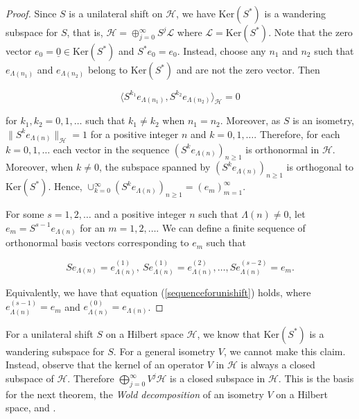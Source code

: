 \documentclass[10pt, reqno]{amsart}
\theoremstyle{definition}
\numberwithin{equation}{section}
\begin{document}
\begin{proof}
    Since $S$ is a unilateral shift on $\mathcal{H}$, we have $\mathrm{Ker}(S^{*})$ is a wandering subspace for $S$, that is, $\mathcal{H}=\oplus_{j=0}^{\infty} S^{j}\mathcal{L}$ where $\mathcal{L}=\mathrm{Ker}(S^{*})$. Note that the zero vector $e_{0}=\underline{0}\in\mathrm{Ker}(S^{*})$ and $S^{*}e_{0}=e_{0}$. Instead, choose any $n_{1}$ and $n_{2}$ such that $e_{\Lambda(n_{1})}$ and $e_{\Lambda(n_{2})}$ belong to $\mathrm{Ker}(S^{*})$ and are not the zero vector. Then

$$\Big\langle S^{k_{1}}e_{\Lambda(n_{1})},S^{k_{2}}e_{\Lambda(n_{2})}\Big\rangle_{\mathcal{H}}=0$$

\noindent for $k_{1},k_{2}=0,1,\hdots$ such that $k_{1}\neq k_{2}$ when $n_{1}=n_{2}$. Moreover, as $S$ is an isometry, $\|S^{k}e_{\Lambda(n)}\|_{\mathcal{H}}=1$ for a positive integer $n$ and $k=0,1,\hdots$. Therefore, for each $k=0,1,\hdots$ each vector in the sequence $(S^{k}e_{\Lambda(n)})_{n\geq 1}$ is orthonormal in $\mathcal{H}$. Moreover, when $k\neq 0$, the subspace spanned by $(S^{k}e_{\Lambda(n)})_{n\geq 1}$ is orthogonal to $\mathrm{Ker}(S^{*})$. Hence, $\cup_{k=0}^{\infty} (S^{k}e_{\Lambda(n)})_{n\geq 1} =(e_{m})_{m=1}^{\infty}$. 

For some $s=1,2,\hdots$ and a positive integer $n$ such that $\Lambda(n)\neq 0$, let $e_{m}=S^{s-1}e_{\Lambda(n)}$ for an $m=1,2,\hdots$. We can define a finite sequence of orthonormal basis vectors corresponding to $e_{m}$ such that

$$Se_{\Lambda(n)}=e_{\Lambda(n)}^{(1)},~ Se^{(1)}_{\Lambda(n)}=e_{\Lambda(n)}^{(2)},\hdots,Se_{\Lambda(n)}^{(s-2)}=e_{m}.$$

\noindent Equivalently, we have that equation (\ref{sequenceforunishift}) holds, where $e_{\Lambda(n)}^{(s-1)}=e_{m}$ and $e_{\Lambda(n)}^{(0)}=e_{\Lambda(n)}$.\end{proof}

For a unilateral shift $S$ on a Hilbert space $\mathcal{H}$, we know that $\mathrm{Ker}(S^{*})$ is a wandering subspace for $S$. For a general isometry $V$, we cannot make this claim. Instead, observe that the kernel of an operator $V$ in $\mathcal{H}$ is always a closed subspace of $\mathcal{H}$. Therefore $\bigoplus_{j=0}^{\infty}V^{j}\mathcal{H}$ is a closed subspace in $\mathcal{H}$. This is the basis for the next theorem, the {\it{Wold decomposition}} of an isometry $V$ on a Hilbert space, \cite[Theorem 1.1]{NagyFoais} and \cite[Section 1.3]{RR}.
\end{document}
